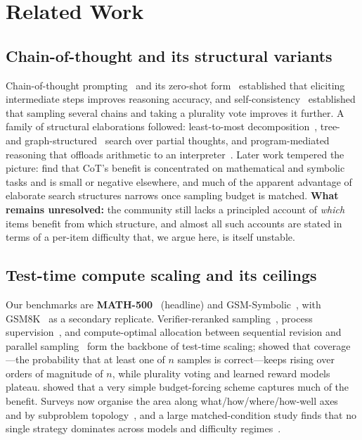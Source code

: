 \section{Related Work}
\label{sec:related}

\subsection{Chain-of-thought and its structural variants}

Chain-of-thought prompting~\citep{wei2022cot} and its zero-shot
form~\citep{kojima2022zeroshot} established that eliciting intermediate steps
improves reasoning accuracy, and self-consistency~\citep{wang2023selfconsistency}
established that sampling several chains and taking a plurality vote improves
it further. A family of structural elaborations followed:
least-to-most decomposition~\citep{zhou2023leasttomost}, tree-~\citep{yao2023tot}
and graph-structured~\citep{besta2024got} search over partial thoughts, and
program-mediated reasoning that offloads arithmetic to an
interpreter~\citep{chen2023pot,gao2023pal}. Later work tempered the picture:
\citet{sprague2025tocot} find that CoT's benefit is concentrated on
mathematical and symbolic tasks and is small or negative elsewhere, and much of
the apparent advantage of elaborate search structures narrows once sampling
budget is matched. \textbf{What remains unresolved:} the community still lacks
a principled account of \emph{which} items benefit from which structure, and
almost all such accounts are stated in terms of a per-item difficulty that, we
argue here, is itself unstable.

\subsection{Test-time compute scaling and its ceilings}

Our benchmarks are \textbf{MATH-500}~\citep{math500} (headline) and
GSM-Symbolic~\citep{mirzadeh2025gsmsymbolic}, with GSM8K~\citep{cobbe2021gsm8k}
as a secondary replicate. Verifier-reranked sampling~\citep{cobbe2021gsm8k}, process
supervision~\citep{lightman2024verify,uesato2022process,wang2024mathshepherd},
and compute-optimal allocation between sequential revision and parallel
sampling~\citep{snell2024scaling,wu2024inference} form the backbone of
test-time scaling; \citet{brown2024monkeys} showed that coverage---the
probability that at least one of $n$ samples is correct---keeps rising over
orders of magnitude of $n$, while plurality voting and learned reward models
plateau. \citet{muennighoff2025s1} showed that a very simple budget-forcing
scheme captures much of the benefit. Surveys now organise the
area along what/how/where/how-well axes~\citep{zhang2025ttssurvey} and by
subproblem topology~\citep{subproblemsurvey2025}, and a large matched-condition
study finds that no single strategy dominates across models and difficulty
regimes~\citep{artofscaling2025}.

